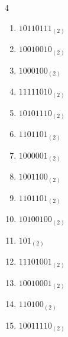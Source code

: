 \begin{multicols}{4}
\begin{enumerate}
        \phantom{$=172$}

  \item $10110111_{(2)}$

        \phantom{$=183$}

\columnbreak %

\resetques

  \item $10010010_{(2)}$

        \phantom{$=146$}

  \item $1000100_{(2)}$

        \phantom{$=68$}

  \item $11111010_{(2)}$

        \phantom{$=250$}

  \item $10101110_{(2)}$

        \phantom{$=174$}

  \item $1101101_{(2)}$

        \phantom{$=109$}

  \item $1000001_{(2)}$

        \phantom{$=65$}

  \item $1001100_{(2)}$

        \phantom{$=76$}

  \item $1101101_{(2)}$

        \phantom{$=109$}

  \item $10100100_{(2)}$

        \phantom{$=164$}

  \item $101_{(2)}$

        \phantom{$=5$}

  \item $11101001_{(2)}$

        \phantom{$=233$}

  \item $10010001_{(2)}$

        \phantom{$=145$}

  \item $110100_{(2)}$

        \phantom{$=52$}

  \item $10011110_{(2)}$


\end{enumerate}
\end{multicols}
